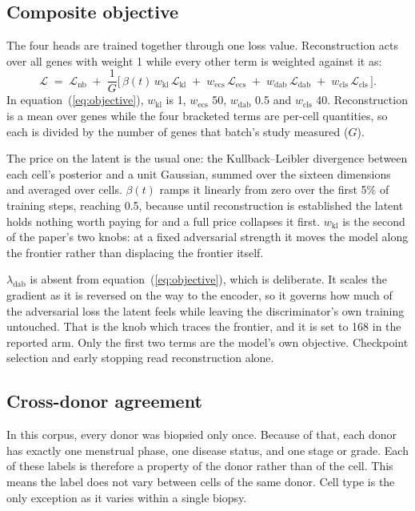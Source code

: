 \subsection*{Composite objective}

The four heads are trained together through one loss value. 
Reconstruction acts over all genes with weight 1 while every other 
term is weighted against it as:
\begin{equation}
\mathcal{L} \;=\; \mathcal{L}_{\text{nb}}
\;+\; \frac{1}{G}\Big[\,
\beta(t)\, w_{\text{kl}}\, \mathcal{L}_{\text{kl}}
\;+\; w_{\text{ecs}}\, \mathcal{L}_{\text{ecs}}
\;+\; w_{\text{dab}}\, \mathcal{L}_{\text{dab}}
\;+\; w_{\text{cls}}\, \mathcal{L}_{\text{cls}}
\,\Big] .
\label{eq:objective}
\end{equation}
In equation~(\ref{eq:objective}), $w_{\text{kl}}$ is 1, $w_{\text{ecs}}$ 50, $w_{\text{dab}}$ 0.5 and
$w_{\text{cls}}$ 40. Reconstruction is a mean over genes while the four
bracketed terms are per-cell quantities, so each is divided by the number of 
genes that batch's study measured ($G$).

The price on the latent is the usual one: the Kullback--Leibler divergence
between each cell's posterior and a unit Gaussian, summed over the sixteen
dimensions and averaged over cells. $\beta(t)$ ramps it linearly from zero
over the first 5\% of training steps, reaching 0.5, because until
reconstruction is established the latent holds nothing worth paying for and
a full price collapses it first. $w_{\text{kl}}$ is the second of the
paper's two knobs: at a fixed adversarial strength it moves the model along
the frontier rather than displacing the frontier itself.

$\lambda_{\text{dab}}$ is absent from equation~(\ref{eq:objective}), which is deliberate. It
scales the gradient as it is reversed on the way to the encoder, so it
governs how much of the adversarial loss the latent feels while leaving the
discriminator's own training untouched. That is the knob which traces the
frontier, and it is set to 168 in the reported arm. Only the first two 
terms are the model's own objective. Checkpoint selection and early 
stopping read reconstruction alone.


\subsection*{Cross-donor agreement}

In this corpus, every donor was biopsied only once. Because of that, each 
donor has exactly one menstrual phase, one disease status, and one stage or 
grade. Each of these labels is therefore a property of the donor rather than 
of the cell. This means the label does not vary between cells of the same
donor. Cell type is the only exception as it varies within a single biopsy.

